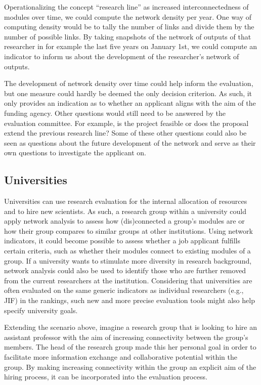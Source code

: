 \documentclass[a5paper]{book}
\begin{document}
Operationalizing the concept \enquote{research line} as increased
interconnectedness of modules over time, we could compute the network
density per year. One way of computing density would be to tally the
number of links and divide them by the number of possible links. By
taking snapshots of the network of outputs of that researcher in for
example the last five years on January 1st, we could compute an
indicator to inform us about the development of the researcher's network
of outputs.

The development of network density over time could help inform the
evaluation, but one measure could hardly be deemed the only decision
criterion. As such, it only provides an indication as to whether an
applicant aligns with the aim of the funding agency. Other questions
would still need to be answered by the evaluation committee. For
example, is the project feasible or does the proposal extend the
previous research line? Some of these other questions could also be seen
as questions about the future development of the network and serve as
their own questions to investigate the applicant on.

\subsection{Universities}\label{universities}

Universities can use research evaluation for the internal allocation of
resources and to hire new scientists. As such, a research group within a
university could apply network analysis to assess how (dis)connected a
group's modules are or how their group compares to similar groups at
other institutions. Using network indicators, it could become possible
to assess whether a job applicant fulfills certain criteria, such as
whether their modules connect to existing modules of a group. If a
university wants to stimulate more diversity in research background,
network analysis could also be used to identify those who are further
removed from the current researchers at the institution. Considering
that universities are often evaluated on the same generic indicators as
individual researchers (e.g., JIF) in the rankings, such new and more
precise evaluation tools might also help specify university goals.

Extending the scenario above, imagine a research group that is looking
to hire an assistant professor with the aim of increasing connectivity
between the group's members. The head of the research group made this
her personal goal in order to facilitate more information exchange and
collaborative potential within the group. By making increasing
connectivity within the group an explicit aim of the hiring process, it
can be incorporated into the evaluation process.
\end{document}
